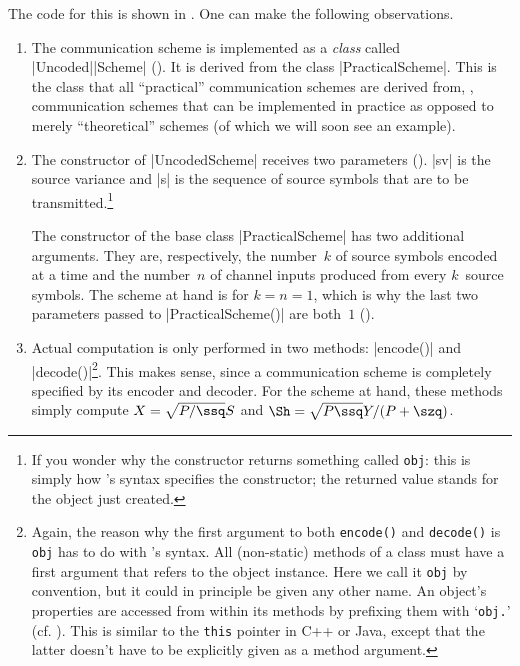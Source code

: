 The code for this is shown in .  One can make the following
observations.
\begin{enumerate}
  \item The communication scheme is implemented as a \emph{class} called
    |Uncoded|\-|Scheme| (). It is derived from the class
    |PracticalScheme|. This is the class that all ``practical'' communication
    schemes are derived from, \ie, communication schemes that can be implemented
    in practice as opposed to merely ``theoretical'' schemes (of which we will
    soon see an example).

  \item The constructor of |UncodedScheme| receives two parameters
    (). |sv| is the source variance and |s| is the sequence of source
    symbols that are to be transmitted.\footnote{If you wonder why the
    constructor returns something called \Verb+obj+: this is simply how
    \matlab's syntax specifies the constructor; the returned value stands for
    the object just created.}

    The constructor of the base class |PracticalScheme| has two additional
    arguments. They are, respectively, the number~$k$ of source symbols encoded
    at a time and the number~$n$ of channel inputs produced from every
    $k$~source symbols. The scheme at hand is for $k = n = 1$, which is why the
    last two parameters passed to |PracticalScheme()| are both~$1$
    ().

  \item Actual computation is only performed in two methods: |encode()| and
    |decode()|\footnote{Again, the reason why the first argument to both
    \Verb+encode()+ and \Verb+decode()+ is \Verb+obj+ has to do with \matlab's
    syntax. All (non-static) methods of a class must have a first argument that
    refers to the object instance. Here we call it \Verb+obj+ by convention, but
    it could in principle be given any other name. An object's properties are
    accessed from within its methods by prefixing them with `\Verb+obj.+' (cf.
    ).  This is similar to the \Verb+this+ pointer in C++ or
    Java, except that the latter doesn't have to be explicitly given as a method
    argument.}. This makes sense, since a communication scheme is completely
    specified by its encoder and decoder.  For the scheme at hand, these methods
    simply compute $X = \sqrt{P/\ssq} S$ and $\Sh = \sqrt{P \ssq} Y / (P +
    \szq)$.
    
\end{enumerate}


